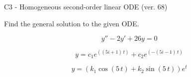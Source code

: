 \begin{exercise}
  \begin{exerciseTitle}C3 - Homogeneous second-order linear ODE (ver. 68)\end{exerciseTitle}
  \begin{exerciseStatement}
    
Find the general solution to the given ODE.

    
\[y''-2y'+26y = 0\]

  \end{exerciseStatement}
  \begin{exerciseAnswer}
    
\[y= c_{1} e^{\left(\left(5 i + 1\right) \, t\right)} + c_{2} e^{\left(-\left(5 i - 1\right) \, t\right)}\]

    
\[y= {\left(k_{1} \cos\left(5 \, t\right) + k_{2} \sin\left(5 \, t\right)\right)} e^{t}\]

  \end{exerciseAnswer}
\end{exercise}
